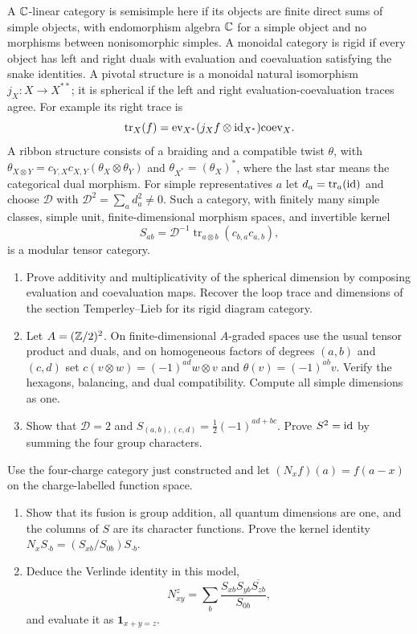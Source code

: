 \begin{exercise}
A $\mathbb C$-linear category is semisimple here if its objects are finite
direct sums of simple objects, with endomorphism algebra $\mathbb C$
for a simple object and no morphisms between nonisomorphic
simples. A monoidal category is rigid if every object has left
and right duals with evaluation and coevaluation satisfying
the snake identities. A pivotal structure is a monoidal
natural isomorphism $j_X:X\to X^{**}$; it is spherical if the
left and right evaluation-coevaluation traces agree.
For example its right trace is
\[
 \operatorname{tr}_X(f)=
 \mathrm{ev}_{X^*}(j_Xf\otimes\operatorname{id}_{X^*})\mathrm{coev}_X.
\]
A ribbon structure consists of a braiding and a compatible
twist $\theta$, with
$\theta_{X\otimes Y}=c_{Y,X}c_{X,Y}(\theta_X\otimes\theta_Y)$
and $\theta_{X^*}=(\theta_X)^*$, where the last star means
the categorical dual morphism.
For simple representatives $a$ let $d_a=\operatorname{tr}_a(\operatorname{id})$
and choose $\mathcal D$ with $\mathcal D^2=\sum_a d_a^2\ne0$.
Such a category, with finitely many simple classes, simple unit,
finite-dimensional morphism spaces, and invertible kernel
\[
 S_{ab}=\mathcal D^{-1}
          \operatorname{tr}_{a\otimes b}(c_{b,a}c_{a,b}),
\]
is a modular tensor category.
\begin{enumerate}[label=(\alph*)]
\item Prove additivity and multiplicativity of the spherical
dimension by composing evaluation and coevaluation maps.
Recover the loop trace and dimensions of the section
Temperley--Lieb for its rigid diagram category.
\item Let $A=(\mathbb Z/2)^2$. On finite-dimensional $A$-graded
spaces use the usual tensor product and duals, and on
homogeneous factors of degrees $(a,b)$ and $(c,d)$ set
$c(v\otimes w)=(-1)^{ad}w\otimes v$ and
$\theta(v)=(-1)^{ab}v$.
Verify the hexagons, balancing, and dual compatibility.
Compute all simple dimensions as one.
\item Show that $\mathcal D=2$ and
$S_{(a,b),(c,d)}=\frac12(-1)^{ad+bc}$.
Prove $S^2=\operatorname{id}$ by summing the four group characters.
\end{enumerate}
\end{exercise}

\begin{exercise}
Use the four-charge category just constructed and let
$(N_xf)(a)=f(a-x)$ on the charge-labelled function space.
\begin{enumerate}[label=(\alph*)]
\item Show that its fusion is group addition, all quantum
dimensions are one, and the columns of $S$ are its
character functions. Prove the kernel identity
$N_xS_{\cdot b}=(S_{xb}/S_{0b})S_{\cdot b}$.
\item Deduce the Verlinde identity in this model,
\[
 N_{xy}^{z}=\sum_b\frac{S_{xb}S_{yb}\overline{S_{zb}}}{S_{0b}},
\]
and evaluate it as $\mathbf1_{x+y=z}$.
\end{enumerate}
\end{exercise}

